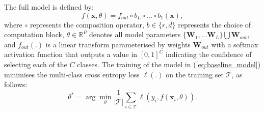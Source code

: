 \documentclass[10pt,journal,compsoc]{IEEEtran}
\begin{document}
The full model is defined by:
\begin{equation}
f(\mathbf{x}, \theta ) = f_{out} \circ b_L \circ ... \circ b_1( \mathbf{x} ),
\label{eq:baseline_model}
\end{equation}
where $\circ$ represents the composition operator, $b \in \{r, d\}$ represents the choice of computation block, $\theta \in \mathbb R^P$ denotes all model parameters $\{ \mathbf{W}_1, ... \mathbf{W}_L \} \bigcup \mathbf{W}_{out}$, and $f_{out}(.)$ is a linear transform parameterised by weights $\mathbf{W}_{out}$ with a softmax activation function that outputs a value in $[0,1]^C$ indicating the confidence of selecting each of the $C$ classes.  The training of the model in (\ref{eq:baseline_model}) minimises the multi-class cross entropy loss $\ell ( . )$ on the training set $\mathcal{T}$, as follows:
\begin{equation}
\theta^* = \arg \min_{\theta} \frac{1}{|\mathcal{T}|}\sum_{i \in \mathcal{T}} \ell \left ( y_i , f(\mathbf{x}_i, \theta )  \right ).
\label{eq:training_CNN}
\end{equation}
\end{document}
